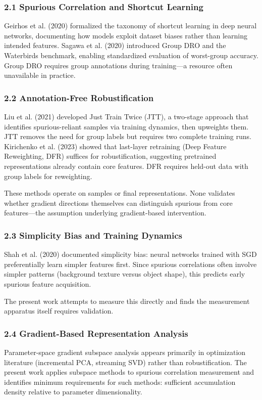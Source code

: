 
\subsubsection{2.1 Spurious Correlation and Shortcut Learning}

Geirhos et al. (2020) formalized the taxonomy of shortcut learning in deep neural networks, documenting how models exploit dataset biases rather than learning intended features. Sagawa et al. (2020) introduced Group DRO and the Waterbirds benchmark, enabling standardized evaluation of worst-group accuracy. Group DRO requires group annotations during training---a resource often unavailable in practice.

\subsubsection{2.2 Annotation-Free Robustification}

Liu et al. (2021) developed Just Train Twice (JTT), a two-stage approach that identifies spurious-reliant samples via training dynamics, then upweights them. JTT removes the need for group labels but requires two complete training runs. Kirichenko et al. (2023) showed that last-layer retraining (Deep Feature Reweighting, DFR) suffices for robustification, suggesting pretrained representations already contain core features. DFR requires held-out data with group labels for reweighting.

These methods operate on samples or final representations. None validates whether gradient directions themselves can distinguish spurious from core features---the assumption underlying gradient-based intervention.

\subsubsection{2.3 Simplicity Bias and Training Dynamics}

Shah et al. (2020) documented simplicity bias: neural networks trained with SGD preferentially learn simpler features first. Since spurious correlations often involve simpler patterns (background texture versus object shape), this predicts early spurious feature acquisition.

The present work attempts to measure this directly and finds the measurement apparatus itself requires validation.

\subsubsection{2.4 Gradient-Based Representation Analysis}

Parameter-space gradient subspace analysis appears primarily in optimization literature (incremental PCA, streaming SVD) rather than robustification. The present work applies subspace methods to spurious correlation measurement and identifies minimum requirements for such methods: sufficient accumulation density relative to parameter dimensionality.

